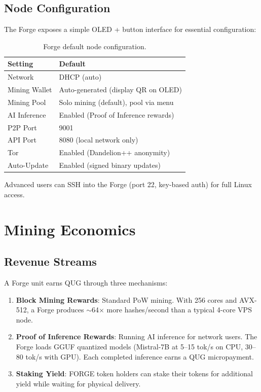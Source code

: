 \documentclass[11pt,a4paper]{article}
\begin{document}
\subsection{Node Configuration}

The Forge exposes a simple OLED + button interface for essential configuration:

\begin{table}[H]
\centering
\begin{tabular}{@{}ll@{}}
\toprule
\textbf{Setting} & \textbf{Default} \\
\midrule
Network & DHCP (auto) \\
Mining Wallet & Auto-generated (display QR on OLED) \\
Mining Pool & Solo mining (default), pool via menu \\
AI Inference & Enabled (Proof of Inference rewards) \\
P2P Port & 9001 \\
API Port & 8080 (local network only) \\
Tor & Enabled (Dandelion++ anonymity) \\
Auto-Update & Enabled (signed binary updates) \\
\bottomrule
\end{tabular}
\caption{Forge default node configuration.}
\end{table}

Advanced users can SSH into the Forge (port 22, key-based auth) for full Linux access.

\section{Mining Economics}

\subsection{Revenue Streams}

A Forge unit earns QUG through three mechanisms:

\begin{enumerate}
    \item \textbf{Block Mining Rewards}: Standard PoW mining. With 256 cores and AVX-512, a Forge produces $\sim$64$\times$ more hashes/second than a typical 4-core VPS node.

    \item \textbf{Proof of Inference Rewards}: Running AI inference for network users. The Forge loads GGUF quantized models (Mistral-7B at 5--15 tok/s on CPU, 30--80 tok/s with GPU). Each completed inference earns a QUG micropayment.

    \item \textbf{Staking Yield}: FORGE token holders can stake their tokens for additional yield while waiting for physical delivery.
\end{enumerate}
\end{document}

